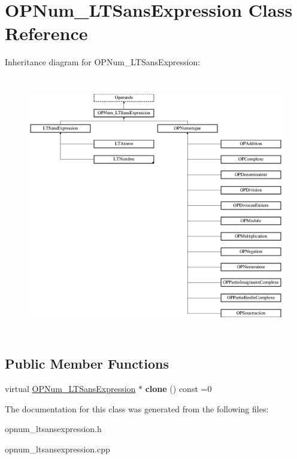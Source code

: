 \hypertarget{class_o_p_num___l_t_sans_expression}{}\section{O\+P\+Num\+\_\+\+L\+T\+Sans\+Expression Class Reference}
\label{class_o_p_num___l_t_sans_expression}
Inheritance diagram for O\+P\+Num\+\_\+\+L\+T\+Sans\+Expression\+:\begin{figure}[H]
\begin{center}
\leavevmode
\includegraphics[height=11.413043cm]{class_o_p_num___l_t_sans_expression}
\end{center}
\end{figure}
\subsection*{Public Member Functions}
\begin{DoxyCompactItemize}
\item 
virtual \hyperlink{class_o_p_num___l_t_sans_expression}{O\+P\+Num\+\_\+\+L\+T\+Sans\+Expression} $\ast$ {\bfseries clone} () const  =0\hypertarget{class_o_p_num___l_t_sans_expression_a9f7c47913c9ca5d03f66a6918facd442}{}\label{class_o_p_num___l_t_sans_expression_a9f7c47913c9ca5d03f66a6918facd442}

\end{DoxyCompactItemize}


The documentation for this class was generated from the following files\+:\begin{DoxyCompactItemize}
\item 
opnum\+\_\+ltsansexpression.\+h\item 
opnum\+\_\+ltsansexpression.\+cpp\end{DoxyCompactItemize}
